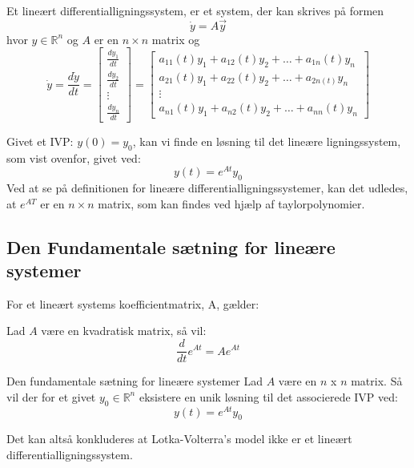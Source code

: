 \begin{definition}\label{LinSys}
Et lineært differentialligningssystem, er et system, der kan skrives på formen
$$\dot{y} = A \vec{y}$$
hvor $y \in \mathbb{R}^n$ og $A$ er en $n\times n$ matrix og
$$\dot{y} = \frac{d\dot{y}}{dt} = 
\begin{bmatrix}
\frac{dy_1}{dt} \\
\frac{dy_2}{dt}\\
\vdots \\
\frac{dy_n}{dt}
\end{bmatrix}
=
\begin{bmatrix}
a_{11}(t)y_1+a_{12}(t)y_2+ \hdots + a_{1n}(t)y_n\\
a_{21}(t)y_1+a_{22}(t)y_2+ \hdots + a_{2n(t)}y_n\\
\vdots \\
a_{n1}(t)y_1+a_{n2}(t)y_2+ \hdots + a_{nn}(t)y_n
\end{bmatrix}$$
\end{definition}
\hfill \break
Givet et IVP: $y(0) = y_0$, kan vi finde en løsning til det lineære ligningssystem, som vist ovenfor, givet ved:
$$y(t) = e^{At}y_0$$
Ved at se på definitionen for lineære differentialligningssystemer, kan det udledes, at $e^{AT}$ er en $n\times n$ matrix, som kan findes ved hjælp af taylorpolynomier.%

\subsection{Den Fundamentale sætning for lineære systemer}

For et lineært systems koefficientmatrix, A, gælder:
\begin{lemma}{}{}
Lad $A$ være en kvadratisk matrix, så vil:
$$\frac{d}{dt}e^{At} = Ae^{At}$$
\end{lemma}

\begin{mytheo}{Den fundamentale sætning for lineære systemer}{}
Lad $A$ være en $n$ x $n$ matrix. Så vil der for et givet $y_0 \in \mathbb{R}^n$ eksistere en unik løsning til det associerede IVP ved:
$$y(t) = e^{At}y_0$$
\end{mytheo}

Det kan altså konkluderes at Lotka-Volterra's model ikke er et lineært differentialligningssystem.